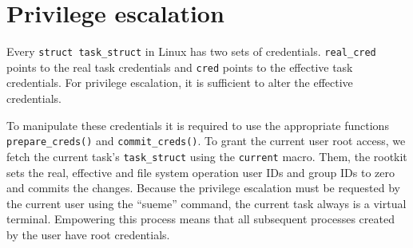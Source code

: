 \section{Privilege escalation}
Every \texttt{struct task\_struct} in Linux has two sets of credentials. 
\texttt{real\_cred} points to the real task credentials and \texttt{cred} points 
to the effective task credentials. For privilege escalation, it is sufficient to 
alter the effective credentials.\par
To manipulate these credentials it is required to use the appropriate functions 
\texttt{prepare\_creds()} and \texttt{commit\_creds()}.
To grant the current user root access, we fetch the current task's 
\texttt{task\_struct} using the \texttt{current} macro. Them, the rootkit sets 
the real, effective and file system operation user IDs and group IDs to zero 
and commits the changes. Because the privilege escalation must be requested by 
the current user using the ``sueme'' command, the current task always is a 
virtual terminal. Empowering this process means that all subsequent processes 
created by the user have root credentials.